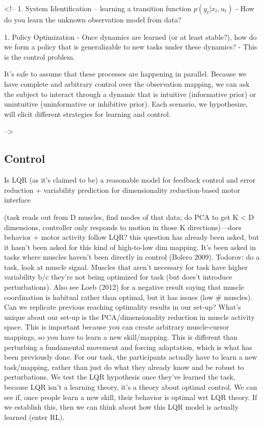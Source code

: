 \documentclass[../main.tex]{subfiles}
\begin{document}
{{{{{{{{{{{<!-- 1. System Identification -- learning a transition function $p(y_t|x_t, u_t)$
    - How do you learn the unknown observation model from data?

1. Policy Optimization
    - Once dynamics are learned (or at least stable?), how do we form a policy that is generalizable to new tasks under these dynamics?
    - This is the control problem.

It's safe to assume that these processes are happening in parallel. Because we have complete and arbitrary control over the observation mapping, we can ask the subject to interact through a  dynamic that is intuitive (informative prior) or unintuitive (uninformative or inhibitive prior). Each scenario, we hypothesize, will elicit different strategies for learning and control.

-->


\subsection{Control}\label{control}

Is LQR (as it's claimed to be) a reasonable model for feedback control
and error reduction + variability prediction for dimensionality
reduction-based motor interface

(task reads out from D muscles, find modes of that data; do PCA to get K
\textless{} D dimensions, controller only responds to motion in those K
directions)---does behavior + motor activity follow LQR? this question
has already been asked, but it hasn't been asked for this kind of
high-to-low dim mapping. It's been asked in tasks where muscles haven't
been directly in control (Bolero 2009). Todorov: do a task, look at
muscle signal. Muscles that aren't necessary for task have higher
variability b/c they're not being optimized for task (but does't
introduce perturbations). Also see Loeb (2012) for a negative result
saying that muscle coordination is habitual rather than optimal, but it
has issues (low \# muscles). Can we replicate previous reaching
optimality results in our set-up? What's unique about our set-up is the
PCA/dimensionality reduction in muscle activity space. This is important
because you can create arbitrary muscle-cursor mappings, so you have to
learn a new skill/mapping. This is different than perturbing a
fundamental movement and forcing adaptation, which is what has been
previously done. For our task, the participants actually have to learn a
new task/mapping, rather than just do what they already know and be
robust to perturbations. We test the LQR hypothesis once they've learned
the task, because LQR isn't a learning theory, it's a theory about
optimal control. We can see if, once people learn a new skill, their
behavior is optimal wrt LQR theory. If we establish this, then we can
think about how this LQR model is actually learned (enter RL).

}}}}}}}}}}}
\end{document}
